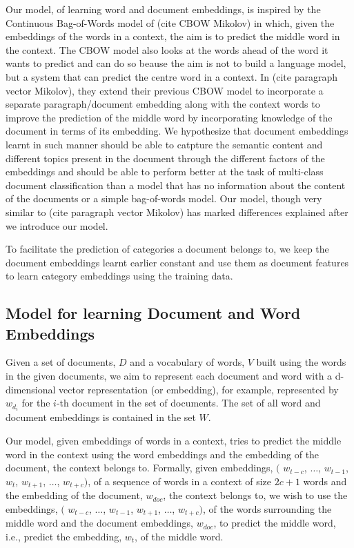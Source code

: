 \documentclass{article}
\begin{document}
Our model, of learning word and document embeddings, is inspired by the Continuous Bag-of-Words model of (cite CBOW Mikolov) in which, given the embeddings of the words in a context, the aim is to predict the middle word in the context. The CBOW model also looks at the words ahead of the word it wants to predict and can do so beause the aim is not to build a language model, but a system that can predict the centre word in a context. In (cite paragraph vector Mikolov), they extend their previous CBOW model to incorporate a separate paragraph/document embedding along with the context words to improve the prediction of the middle word by incorporating knowledge of the document in terms of its embedding. 
We hypothesize that document embeddings learnt in such manner should be able to catpture the semantic content and different topics present in the document through the different factors of the embeddings and should be able to perform better at the task of multi-class document classification than a model that has no information about the content of the documents or a simple bag-of-words model. Our model, though very similar to (cite paragraph vector Mikolov) has marked differences explained after we introduce our model.

To facilitate the prediction of categories a document belongs to, we keep the document embeddings learnt earlier constant and use them as document features to learn category embeddings using the training data.

\subsection{Model for learning Document and Word Embeddings}
Given a set of documents, $D$ and a vocabulary of words, $V$ built using the words in the given documents, we aim to represent each document and word with a d-dimensional vector representation (or embedding), for example, represented by $w_{d_{i}}$  for the $i$-th document in the set of documents. 
The set of all word and document embeddings is contained in the set $W$. 

Our model, given embeddings of words in a context, tries to predict the middle word in the context using the word embeddings and the embedding of the document, the context belongs to. 
Formally, given embeddings, $($ $w_{t-c}$, $\ldots$, $w_{t-1}$, $w_{t}$, $w_{t+1}$, $\ldots$, $w_{t+c}$$)$, of a sequence of words in a context of size $2c +1$ words and the embedding of the document, $w_{doc}$, the context belongs to, we wish to use the embeddings, $($ $w_{t-c}$, $\ldots$, $w_{t-1}$, $w_{t+1}$, $\ldots$, $w_{t+c}$$)$, of the words surrounding the middle word and the document embeddings, $w_{doc}$, to predict the middle word, i.e., predict the embedding, $w_{t}$, of the middle word.
\end{document}

